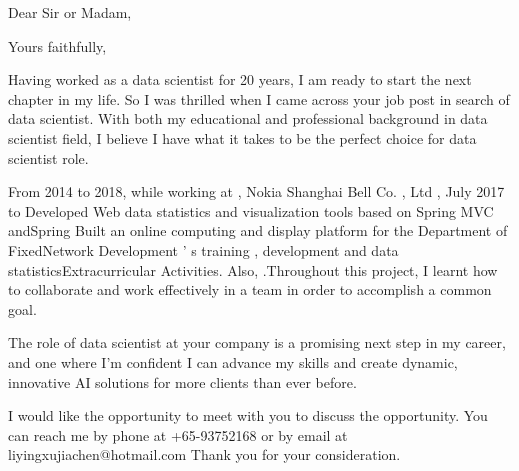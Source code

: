 \documentclass[11pt,a4paper,sans]{moderncv}        %
\begin{document}
\recipient{\quad}{\quad}
\date{March 09 2020}
\opening{Dear Sir or Madam,}
\closing{Yours faithfully,}
\makelettertitle


Having worked as a data scientist for 20 years, I am ready to start the next chapter in my life. So I was thrilled when I came across your job post in search of data scientist. With both my educational and professional background in data scientist field, I believe I have what it takes to be the perfect choice for data scientist role.


From 2014 to 2018, while working at , Nokia Shanghai Bell Co. , Ltd , July 2017 to Developed Web data statistics and visualization tools based on Spring MVC andSpring Built an online computing and display platform for the Department of FixedNetwork Development ’ s training , development and data statisticsExtracurricular Activities. Also, .Throughout this project, I learnt how to collaborate and work effectively in a team in order to accomplish a common goal.


The role of data scientist at your company is a promising next step in my career, and one where I’m confident I can advance my skills and create dynamic, innovative AI solutions for more clients than ever before.


I would like the opportunity to meet with you to discuss the opportunity. You can reach me by phone at +65-93752168 or by email at liyingxujiachen@hotmail.com
Thank you for your consideration.


\makeletterclosing
\end{document}
